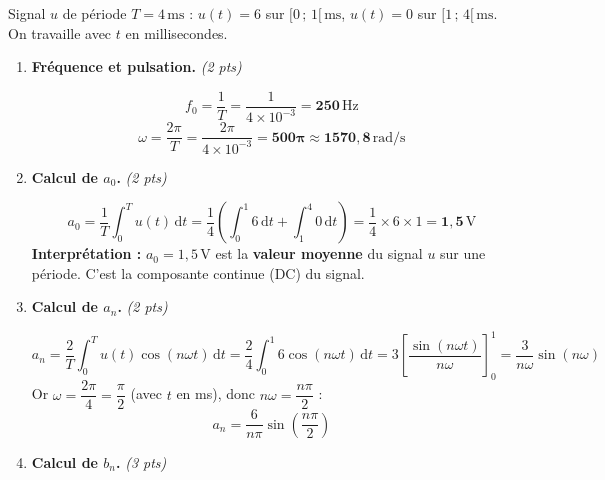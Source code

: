 \documentclass[a4paper,11pt]{article}
\newcommand{\dt}{\mathrm{d}t}
\newcommand{\reponse}[1]{\begin{tcolorbox}[reponsebox]#1\end{tcolorbox}}
\begin{document}
\newpage

\begin{tcolorbox}[exobox={Exercice 2 \hfill \normalfont\textit{(10 points)}}]
Signal $u$ de période $T = 4\,\mathrm{ms}$ : $u(t) = 6$ sur $[0\,;\,1[\,\mathrm{ms}$, $u(t) = 0$ sur $[1\,;\,4[\,\mathrm{ms}$.\\
On travaille avec $t$ en millisecondes.
\end{tcolorbox}

\begin{enumerate}[label=\textbf{\arabic*.}, itemsep=0.4cm]

  \item \textbf{Fréquence et pulsation.} \hfill\textit{(2 pts)}

  \reponse{
  \[
    f_0 = \frac{1}{T} = \frac{1}{4\times10^{-3}} = \mathbf{250\,\mathrm{Hz}}
  \]
  \[
    \omega = \frac{2\pi}{T} = \frac{2\pi}{4\times10^{-3}} = \mathbf{500\pi \approx 1570{,}8\,\mathrm{rad/s}}
  \]
  }

  \item \textbf{Calcul de $a_0$.} \hfill\textit{(2 pts)}

  \reponse{
  \[
    a_0 = \frac{1}{T}\int_0^{T} u(t)\,\dt = \frac{1}{4}\left(\int_0^{1}6\,\dt + \int_1^{4}0\,\dt\right) = \frac{1}{4}\times 6\times 1 = \mathbf{1{,}5\,\mathrm{V}}
  \]
  \textbf{Interprétation :} $a_0 = 1{,}5\,\mathrm{V}$ est la \textbf{valeur moyenne} du signal $u$ sur une période. C'est la composante continue (DC) du signal.
  }

  \item \textbf{Calcul de $a_n$.} \hfill\textit{(2 pts)}

  \reponse{
  \[
    a_n = \frac{2}{T}\int_0^{T} u(t)\cos(n\omega t)\,\dt
    = \frac{2}{4}\int_0^{1} 6\cos(n\omega t)\,\dt
    = 3\left[\frac{\sin(n\omega t)}{n\omega}\right]_0^1
    = \frac{3}{n\omega}\sin(n\omega)
  \]
  Or $\omega = \dfrac{2\pi}{4} = \dfrac{\pi}{2}$ (avec $t$ en ms), donc $n\omega = \dfrac{n\pi}{2}$ :
  \[
    \boxed{a_n = \frac{6}{n\pi}\sin\!\left(\frac{n\pi}{2}\right)}
  \]
  }

  \item \textbf{Calcul de $b_n$.} \hfill\textit{(3 pts)}


\end{enumerate}
\end{document}
